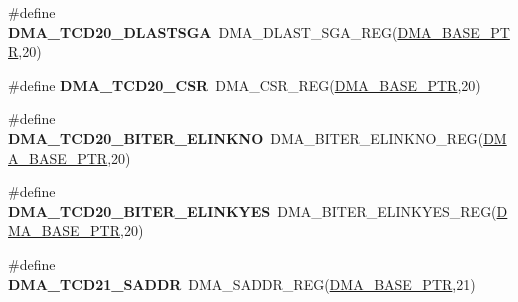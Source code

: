 \begin{DoxyCompactItemize}
\item 
\hypertarget{group___d_m_a___register___accessor___macros_ga2ec5772a321c2fff655508752fdc3730}{}\#define {\bfseries D\+M\+A\+\_\+\+T\+C\+D20\+\_\+\+D\+L\+A\+S\+T\+S\+G\+A}~D\+M\+A\+\_\+\+D\+L\+A\+S\+T\+\_\+\+S\+G\+A\+\_\+\+R\+E\+G(\hyperlink{group___d_m_a___peripheral_ga6997fbc1b1973e9f27170217a3bd6f22}{D\+M\+A\+\_\+\+B\+A\+S\+E\+\_\+\+P\+T\+R},20)\label{group___d_m_a___register___accessor___macros_ga2ec5772a321c2fff655508752fdc3730}

\item 
\hypertarget{group___d_m_a___register___accessor___macros_gadad4f396e4f170660a97050290669935}{}\#define {\bfseries D\+M\+A\+\_\+\+T\+C\+D20\+\_\+\+C\+S\+R}~D\+M\+A\+\_\+\+C\+S\+R\+\_\+\+R\+E\+G(\hyperlink{group___d_m_a___peripheral_ga6997fbc1b1973e9f27170217a3bd6f22}{D\+M\+A\+\_\+\+B\+A\+S\+E\+\_\+\+P\+T\+R},20)\label{group___d_m_a___register___accessor___macros_gadad4f396e4f170660a97050290669935}

\item 
\hypertarget{group___d_m_a___register___accessor___macros_gab3a00eee36d316b42e71321ea6a60183}{}\#define {\bfseries D\+M\+A\+\_\+\+T\+C\+D20\+\_\+\+B\+I\+T\+E\+R\+\_\+\+E\+L\+I\+N\+K\+N\+O}~D\+M\+A\+\_\+\+B\+I\+T\+E\+R\+\_\+\+E\+L\+I\+N\+K\+N\+O\+\_\+\+R\+E\+G(\hyperlink{group___d_m_a___peripheral_ga6997fbc1b1973e9f27170217a3bd6f22}{D\+M\+A\+\_\+\+B\+A\+S\+E\+\_\+\+P\+T\+R},20)\label{group___d_m_a___register___accessor___macros_gab3a00eee36d316b42e71321ea6a60183}

\item 
\hypertarget{group___d_m_a___register___accessor___macros_ga08ebfda751485ce06c10c868d2fa3b3d}{}\#define {\bfseries D\+M\+A\+\_\+\+T\+C\+D20\+\_\+\+B\+I\+T\+E\+R\+\_\+\+E\+L\+I\+N\+K\+Y\+E\+S}~D\+M\+A\+\_\+\+B\+I\+T\+E\+R\+\_\+\+E\+L\+I\+N\+K\+Y\+E\+S\+\_\+\+R\+E\+G(\hyperlink{group___d_m_a___peripheral_ga6997fbc1b1973e9f27170217a3bd6f22}{D\+M\+A\+\_\+\+B\+A\+S\+E\+\_\+\+P\+T\+R},20)\label{group___d_m_a___register___accessor___macros_ga08ebfda751485ce06c10c868d2fa3b3d}

\item 
\hypertarget{group___d_m_a___register___accessor___macros_gaf81adb74cf67f339b7541bde5b127ee0}{}\#define {\bfseries D\+M\+A\+\_\+\+T\+C\+D21\+\_\+\+S\+A\+D\+D\+R}~D\+M\+A\+\_\+\+S\+A\+D\+D\+R\+\_\+\+R\+E\+G(\hyperlink{group___d_m_a___peripheral_ga6997fbc1b1973e9f27170217a3bd6f22}{D\+M\+A\+\_\+\+B\+A\+S\+E\+\_\+\+P\+T\+R},21)\label{group___d_m_a___register___accessor___macros_gaf81adb74cf67f339b7541bde5b127ee0}


\end{DoxyCompactItemize}
